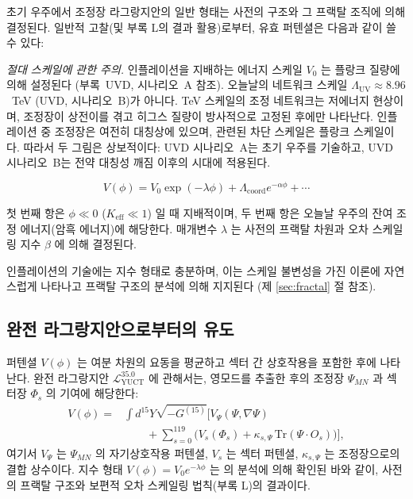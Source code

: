 \documentclass[11pt,a4paper]{article}
\theoremstyle{remark}
\newcommand{\Keff}{K_{\mathrm{eff}}}
\begin{document}
	초기 우주에서 조정장 라그랑지안의 일반 형태는 사전의 구조와 그 프랙탈 조직에 의해 결정된다. 일반적 고찰(및 부록 L의 결과 활용)로부터, 유효 퍼텐셜은 다음과 같이 쓸 수 있다:
	
	\noindent\textit{절대 스케일에 관한 주의.}
	인플레이션을 지배하는 에너지 스케일 $V_0$ 는 플랑크 질량에 의해 설정된다 (부록~UVD, 시나리오~A 참조). 오늘날의 네트워크 스케일 $\Lambda_{\mathrm{UV}} \approx 8.96$~TeV (UVD, 시나리오~B)가 아니다. TeV 스케일의 조정 네트워크는 저에너지 현상이며, 조정장이 상전이를 겪고 히그스 질량이 방사적으로 고정된 후에만 나타난다. 인플레이션 중 조정장은 여전히 대칭상에 있으며, 관련된 차단 스케일은 플랑크 스케일이다. 따라서 두 그림은 상보적이다: UVD 시나리오~A는 초기 우주를 기술하고, UVD 시나리오~B는 전약 대칭성 깨짐 이후의 시대에 적용된다.
	
	\begin{equation}
		V(\phi) = V_0 \exp\left( -\lambda \phi \right) + \Lambda_{\mathrm{coord}} e^{-\alpha \phi} + \cdots
		\label{eq:potential}
	\end{equation}
	
	첫 번째 항은 $\phi \ll 0$ ($\Keff \ll 1$) 일 때 지배적이며, 두 번째 항은 오늘날 우주의 잔여 조정 에너지(암흑 에너지)에 해당한다. 매개변수 $\lambda$ 는 사전의 프랙탈 차원과 오차 스케일링 지수 $\beta$ 에 의해 결정된다.
	
	인플레이션의 기술에는 지수 형태로 충분하며, 이는 스케일 불변성을 가진 이론에 자연스럽게 나타나고 프랙탈 구조의 분석에 의해 지지된다 (제 \ref{sec:fractal} 절 참조).
	
	\subsection{완전 라그랑지안으로부터의 유도}
	
	퍼텐셜 $V(\phi)$ 는 여분 차원의 요동을 평균하고 섹터 간 상호작용을 포함한 후에 나타난다. 완전 라그랑지안 $\mathcal{L}_{\text{YUCT}}^{35.0}$ 에 관해서는, 영모드를 추출한 후의 조정장 $\Psi_{MN}$ 과 섹터장 $\Phi_s$ 의 기여에 해당한다:
	\begin{align}
		V(\phi) = &\int d^{15}Y \sqrt{-G^{(15)}} \Big[ V_{\Psi}(\Psi,\nabla\Psi) \nonumber\\
		&\qquad + \sum_{s=0}^{119} \big( V_s(\Phi_s) + \kappa_{s,\Psi}\,\mathrm{Tr}(\Psi\cdot O_s) \big) \Big],
	\end{align}
	여기서 $V_{\Psi}$ 는 $\Psi_{MN}$ 의 자기상호작용 퍼텐셜, $V_s$ 는 섹터 퍼텐셜, $\kappa_{s,\Psi}$ 는 조정장으로의 결합 상수이다. 지수 형태 $V(\phi)=V_0 e^{-\lambda\phi}$ 는 \cite{Yakushev2026} 의 분석에 의해 확인된 바와 같이, 사전의 프랙탈 구조와 보편적 오차 스케일링 법칙(부록 L)의 결과이다.
	
\end{document}
